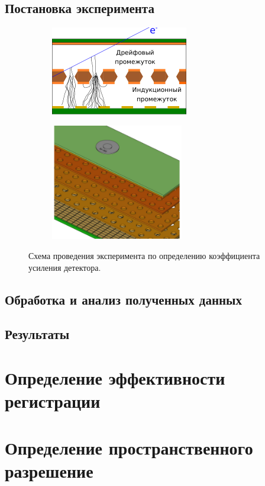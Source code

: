 \subsection{Постановка эксперимента}
\begin{figure}[h]
	\centering
	\begin{subfigure}{.5\textwidth}
		\centering
		\includegraphics[height = 4 cm, width= 6cm]{img/GEM_scheme.pdf}
		\caption{}
		\label{fig:ionization_scheme}
	\end{subfigure}%
	\begin{subfigure}{.5\textwidth}
		\centering
		\includegraphics[height = 4 cm, width= 5.8cm]{img/GEM_Sr_source.pdf}
		\caption{}
		\label{fig:det_scheme+sr90}
	\end{subfigure}
	\caption{Схема проведения эксперимента по определению коэффициента усиления детектора.}
	\label{fig:ampl_exp}
\end{figure}

\subsection{Обработка и анализ полученных данных}
\subsection{Результаты}
\section{Определение эффективности регистрации}
\section{Определение пространственного разрешение}